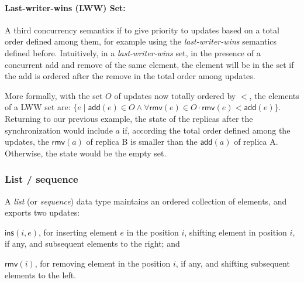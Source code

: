 \documentclass[11pt,a4paper]{article}
\def\land{\mathrel{\wedge}}
\begin{document}
\paragraph{Last-writer-wins (LWW) Set:}
A third concurrency semantics if to give priority to updates based 
on a total order defined among them, for example using the \emph{last-writer-wins}
semantics defined before. 
Intuitively, in a \emph{last-writer-wins} set, in the presence of a concurrent 
add and remove of the same element, the element will be in the set if the add 
is ordered after the remove in the total order among updates.

More formally, with the set $O$ of updates now totally ordered by $<$, the elements
of a LWW set are:
$\{e \mid \mathsf{add}(e) \in O \land \forall \mathsf{rmv}(e) \in O \cdot \mathsf{rmv}(e) < \mathsf{add}(e)\}$.
Returning to our previous example, the state of the replicas after the
synchronization would include $a$ if, according the total order defined 
among the updates, the $\mathsf{rmv}(a)$ of replica B is smaller than
the $\mathsf{add}(a)$ of replica A. Otherwise, the state would be the empty set.

\subsubsection{List / sequence}
A \emph{list} (or \emph{sequence}) data type maintains an ordered collection of 
elements, and exports two updates:
\begin{inparaenum}[(i)]
\item $\mathsf{ins}(i,e)$, for inserting element $e$ in the position $i$, shifting 
element in position $i$, if any, and subsequent elements to the right; and 
\item $\mathsf{rmv}(i)$, for removing element in the position $i$, if any, and shifting
subsequent elements to the left.
\end{inparaenum}

\end{document}
